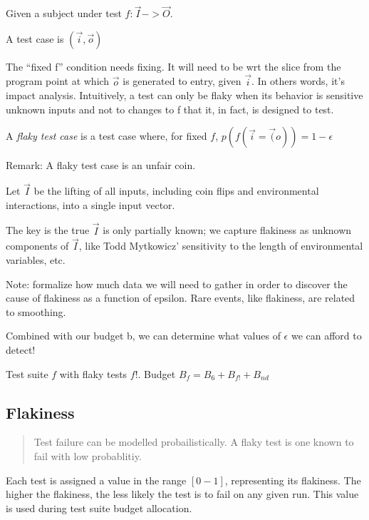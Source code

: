 \begin{defn}
	Given a subject under test $f: \vec{I} -> \vec{O}$.

	A test case is $(\vec{i},\vec{o})$

	The “fixed f” condition needs fixing. It will need to be wrt the slice from the program point at which $\vec{o}$ is generated to entry, given $\vec{i}$. In others words, it’s impact analysis. Intuitively, a test can only be flaky when its behavior is sensitive unknown inputs and not to changes to f that it, in fact, is designed to test.

	A \emph{flaky test case} is a test case where, for fixed $f$,
	$p(f(\vec{i} = \vec(o)) = 1 - \epsilon$

	Remark: A flaky test case is an unfair coin.

	Let $\vec{I}$ be the lifting of all inputs, including coin flips and environmental interactions, into a single input vector.

	The key is the true $\vec{I}$ is only partially known;  we capture flakiness as unknown components of $\vec{I}$, like Todd Mytkowicz’ sensitivity to the length of environmental variables, etc.

	Note: formalize how much data we will need to gather in order to discover the cause of flakiness as a function of epsilon. Rare events, like flakiness, are related to smoothing.

	Combined with our budget b, we can determine what values of $\epsilon$ we can afford to detect!
\end{defn}

Test suite $f$ with flaky tests $f!$.
Budget $B_{f} = B_{6} + B_{f!} + B_{nd}$

\subsection{Flakiness}

\begin{quote}
	Test failure can be modelled probailistically. A flaky test is one known to fail with low probablitiy.
\end{quote}

\begin{defn}\label{def:flakytest}



\end{defn}

Each test is assigned a value in the range $[0-1]$, representing its flakiness. The higher the flakiness, the less likely the test is to fail on any given run. This value is used during test suite budget allocation.

